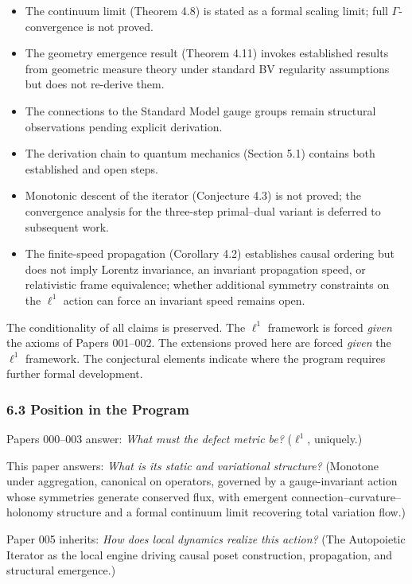 \documentclass[
]{article}
\providecommand{\tightlist}{%
  \setlength{\itemsep}{0pt}\setlength{\parskip}{0pt}}
\begin{document}
\begin{itemize}
\tightlist
\item
  The continuum limit (Theorem 4.8) is stated as a formal scaling limit;
  full \(\Gamma\)-convergence is not proved.
\item
  The geometry emergence result (Theorem 4.11) invokes established
  results from geometric measure theory under standard BV regularity
  assumptions but does not re-derive them.
\item
  The connections to the Standard Model gauge groups remain structural
  observations pending explicit derivation.
\item
  The derivation chain to quantum mechanics (Section 5.1) contains both
  established and open steps.
\item
  Monotonic descent of the iterator (Conjecture 4.3) is not proved; the
  convergence analysis for the three-step primal--dual variant is
  deferred to subsequent work.
\item
  The finite-speed propagation (Corollary 4.2) establishes causal
  ordering but does not imply Lorentz invariance, an invariant
  propagation speed, or relativistic frame equivalence; whether
  additional symmetry constraints on the \(\ell^1\) action can force an
  invariant speed remains open.
\end{itemize}

The conditionality of all claims is preserved. The \(\ell^1\) framework
is forced \emph{given} the axioms of Papers 001--002. The extensions
proved here are forced \emph{given} the \(\ell^1\) framework. The
conjectural elements indicate where the program requires further formal
development.

\subsubsection{6.3 Position in the
Program}\label{position-in-the-program}

Papers 000--003 answer: \emph{What must the defect metric be?}
(\(\ell^1\), uniquely.)

This paper answers: \emph{What is its static and variational structure?}
(Monotone under aggregation, canonical on operators, governed by a
gauge-invariant action whose symmetries generate conserved flux, with
emergent connection--curvature--holonomy structure and a formal
continuum limit recovering total variation flow.)

Paper 005 inherits: \emph{How does local dynamics realize this action?}
(The Autopoietic Iterator as the local engine driving causal poset
construction, propagation, and structural emergence.)
\end{document}
